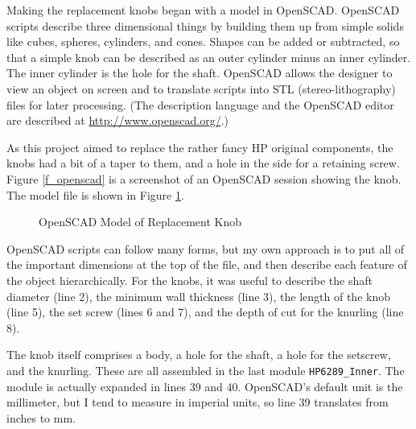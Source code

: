 \documentclass[12pt]{article}
\begin{document}
Making the replacement knobs began with a model in OpenSCAD. OpenSCAD
scripts describe three dimensional things by building them
up from simple solids like cubes, spheres, cylinders, and cones.
Shapes can be added or subtracted, so that a simple knob can be
described as an outer cylinder minus an inner cylinder.  The inner
cylinder is the hole for the shaft. OpenSCAD allows the designer to
view an object on screen and to translate scripts into STL (stereo-lithography)
files for later processing. (The description language and the OpenSCAD
editor are described at \url{http://www.openscad.org/}.)

As this project aimed to replace the rather fancy HP original components,
the knobs had a bit of a taper to them, and a hole in the side for a
retaining screw. Figure \ref{f_openscad} is a screenshot of an OpenSCAD
session showing the knob. The model file is shown in Figure \ref{f_knob_list}.

\begin{figure}[htbp]
  
  \caption{\label{f_knob_list}OpenSCAD Model of Replacement Knob}
  \end{figure}

OpenSCAD scripts can follow many forms, but my own approach is to put
all of the important dimensions at the top of the file, and then
describe each feature of the object hierarchically.  For the knobs,
it was useful to describe the shaft diameter (line 2), 
the minimum wall thickness (line 3), the length of the knob (line 5),
the set screw (lines 6 and 7), and the depth of cut for the knurling (line 8).

The knob itself comprises a body, a hole for the shaft, a hole for the
setscrew, and the knurling.  These are all assembled in the last module
{\tt HP6289\_Inner}. The module is actually expanded in lines 39 and 40.
OpenSCAD's default unit is the millimeter, but I tend to measure in
imperial units, so line 39 translates from inches to mm. 
\end{document}
